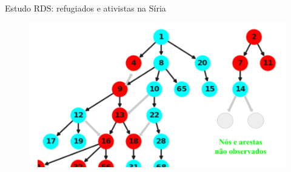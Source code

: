 \documentclass{beamer}
\begin{document}
\begin{frame}{Estudo RDS: refugiados e ativistas na Síria}
\begin{figure}
\begin{overprint}
    \includegraphics[width=\textwidth]{../../images/graph-rds-harvard-4.png}
    \end{overprint}
  \end{figure}  
\end{frame}
\end{document}
